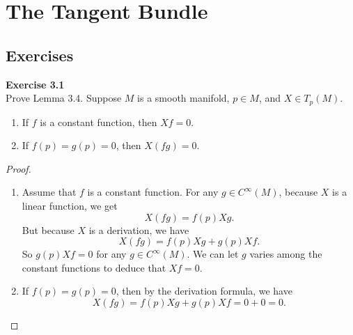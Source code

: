 \documentclass[12pt, a4paper]{article}
\theoremstyle{plain}
\newenvironment{exercise}[2][Exercise]
    { \begin{mdframed}[backgroundcolor=gray!20] \textbf{#1 #2} \\}
    {  \end{mdframed}}
\begin{document}
\section{The Tangent Bundle}

\subsection{Exercises}

\begin{exercise}{3.1}
    Prove Lemma 3.4. Suppose $M$ is a smooth manifold, $p\in M$, and $X\in T_p(M)$.
    \begin{enumerate}[label=(\alph*)]
        \item If $f$ is a constant function, then $Xf=0$.
        \item If $f(p)=g(p)=0$, then $X(fg)=0$.
    \end{enumerate}
\end{exercise}
    \begin{proof}
        \begin{enumerate}[label=(\alph*)]
            \item Assume that $f$ is a constant function. For any $g\in C^{\infty}(M)$, because $X$ is a linear function, we get
            \[
            X(fg)=f(p)Xg.
            \]
            But because $X$ is a derivation, we have
            \[
            X(fg)=f(p)Xg + g(p)Xf.
            \]
            So $g(p)Xf=0$ for any $g\in C^{\infty}(M)$. We can let $g$ varies among the constant functions to deduce that $Xf=0$.
            \item If $f(p)=g(p)=0$, then by the derivation formula, we have
            \[
            X(fg)=f(p)Xg+g(p)Xf=0+0=0.
            \]
        \end{enumerate}
    \end{proof}
\end{document}
